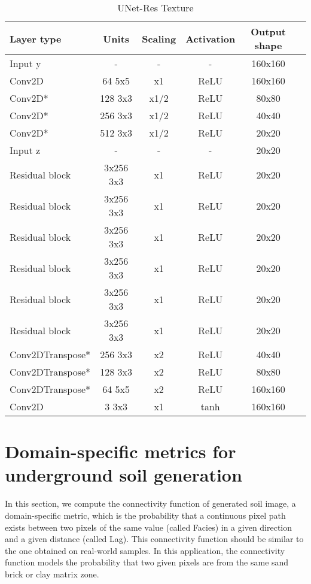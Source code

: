 \begin{table*}[h]
	\centering
	\begin{tabular}{|l|c|c|c|c|c|}
		\hline
		Layer type & Units & Scaling & Activation & Output shape\\
		\hline
		Input y & - & - & - & 160x160\\
		Conv2D & 64 5x5 & x1 & ReLU & 160x160 \\
		Conv2D* & 128 3x3 & x1/2 & ReLU & 80x80 \\
		Conv2D* & 256 3x3 & x1/2 & ReLU & 40x40 \\
		Conv2D* & 512 3x3 & x1/2 & ReLU & 20x20 \\
		Input z & - & - & - & 20x20 \\
		Residual block & 3x256 3x3 & x1 & ReLU & 20x20 \\
		Residual block & 3x256 3x3 & x1 & ReLU & 20x20 \\
		Residual block & 3x256 3x3 & x1 & ReLU & 20x20 \\
		Residual block & 3x256 3x3 & x1 & ReLU & 20x20 \\
		Residual block & 3x256 3x3 & x1 & ReLU & 20x20 \\
		Residual block & 3x256 3x3 & x1 & ReLU & 20x20 \\
		Conv2DTranspose* & 256 3x3 & x2 & ReLU & 40x40 \\
		Conv2DTranspose* & 128 3x3 & x2 & ReLU & 80x80 \\
		Conv2DTranspose* & 64 5x5 & x2 & ReLU & 160x160 \\
		Conv2D & 3 3x3 & x1 & tanh & 160x160 \\
		\hline
	\end{tabular}
	\caption{UNet-Res Texture} 
\end{table*}
\noindent

\section{Domain-specific metrics for underground soil generation}
\label{app:geostatistics}

In this section, we compute the connectivity function \cite{Lemmens2017} of generated soil image, a domain-specific metric, which is the probability that a continuous pixel path exists between two pixels of the same value (called Facies) in a given direction and a given distance (called Lag). This connectivity function should be similar to the one obtained on real-world samples. In this application, the connectivity function models the probability that two given pixels are from the same sand brick or clay matrix zone.

